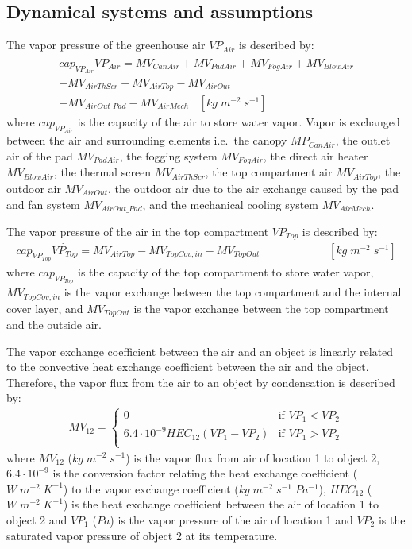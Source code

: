 \documentclass[a4paper]{article}
\begin{document}
\subsection{Dynamical systems and assumptions}
The vapor pressure of the greenhouse air \(VP_{Air}\) is described by:
\begin{multline*}
  cap_{VP_{Air}}\dot{VP_{Air}} = MV_{CanAir} + MV_{PadAir} + MV_{FogAir} + MV_{BlowAir} \\
  - MV_{AirThScr} - MV_{AirTop} - MV_{AirOut} \\
  - MV_{AirOut\_Pad} - MV_{AirMech} ~~~~ [kg\;m^{-2}\;s^{-1}]
\end{multline*}
where \(cap_{VP_{Air}}\) is the capacity of the air to store water vapor.
Vapor is exchanged between the air and surrounding elements i.e.\ the canopy \(MP_{CanAir}\), the outlet air of the pad \(MV_{PadAir}\), the fogging system \(MV_{FogAir}\), the direct air heater \(MV_{BlowAir}\), the thermal screen \(MV_{AirThScr}\), the top compartment air \(MV_{AirTop}\), the outdoor air \(MV_{AirOut}\), the outdoor air due to the air exchange caused by the pad and fan system \(MV_{AirOut\_Pad}\), and the mechanical cooling system \(MV_{AirMech}\).

The vapor pressure of the air in the top compartment \(VP_{Top}\) is described by:
\begin{multline*}
  cap_{VP_{Top}}\dot{VP_{Top}} = MV_{AirTop} - MV_{TopCov,in} - MV_{TopOut} ~~~~~~~~~~~~~~~~~~~~~~~~~~~~ [kg\;m^{-2}\;s^{-1}]
\end{multline*}
where \(cap_{VP_{Top}}\) is the capacity of the top compartment to store water vapor, \(MV_{TopCov,in}\) is the vapor exchange between the top compartment and the internal cover layer, and \(MV_{TopOut}\) is the vapor exchange between the top compartment and the outside air.

The vapor exchange coefficient between the air and an object is linearly related to the convective heat exchange coefficient between the air and the object.
Therefore, the vapor flux from the air to an object by condensation is described by:
\begin{align}
  \label{eq:vapor_conden}
  MV_{12} = \begin{cases}
    0                                       & \text{if~} VP_1 < VP_2 \\
    6.4 \cdot 10^{-9} HEC_{12}(VP_1 - VP_2) & \text{if~} VP_1 > VP_2 \\
  \end{cases}
\end{align}
where \(MV_{12}\) (\(kg\;m^{-2}\;s^{-1}\)) is the vapor flux from air of location 1 to object 2, \(6.4 \cdot 10^{-9}\) is the conversion factor relating the heat exchange coefficient (\(W\;m^{-2}\;K^{-1}\)) to the vapor exchange coefficient (\(kg\;m^{-2}\;s^{-1}\;Pa^{-1}\)), \(HEC_{12}\) (\(W\;m^{-2}\;K^{-1}\)) is the heat exchange coefficient between the air of location 1 to object 2 and \(VP_1\) (\(Pa\)) is the vapor pressure of the air of location 1 and \(VP_2\) is the saturated vapor pressure of object 2 at its temperature.
\end{document}
